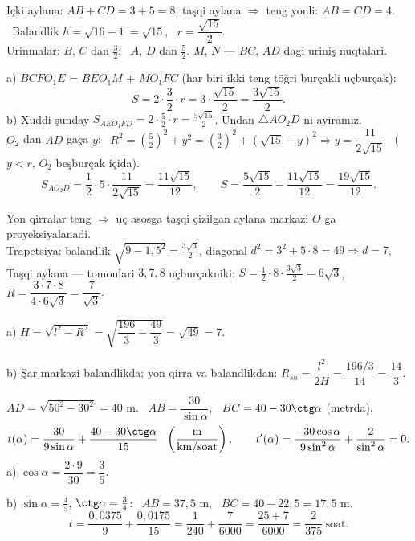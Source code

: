 \newpage
{}
Içki aylana: $AB+CD=3+5=8$; taşqi aylana $\Rightarrow$ teng yonli: $AB=CD=4$. \ Balandlik $h=\sqrt{16-1}=\sqrt{15}$, \ $r=\dfrac{\sqrt{15}}2$.\\
Urinmalar: $B$, $C$ dan $\frac32$; \ $A$, $D$ dan $\frac52$. $M$, $N$ — $BC$, $AD$ dagi uriniş nuqtalari.

a) $BCFO_1E$ = $BEO_1M$ + $MO_1FC$ (har biri ikki teng töğri burçakli uçburçak):
\[S=2\cdot\frac32\cdot r=3\cdot\frac{\sqrt{15}}2=\frac{3\sqrt{15}}2.\]
b) Xuddi şunday $S_{AEO_1FD}=2\cdot\frac52\cdot r=\frac{5\sqrt{15}}2$. Undan $\triangle AO_2D$ ni ayiramiz.\\
$O_2$ dan $AD$ gaça $y$: \ $R^2=\left(\frac52\right)^2+y^2=\left(\frac32\right)^2+(\sqrt{15}-y)^2\Rightarrow y=\dfrac{11}{2\sqrt{15}}$ \ ($y<r$, $O_2$ beşburçak içida).
\[S_{AO_2D}=\frac12\cdot5\cdot\frac{11}{2\sqrt{15}}=\frac{11\sqrt{15}}{12},\qquad S=\frac{5\sqrt{15}}2-\frac{11\sqrt{15}}{12}=\frac{19\sqrt{15}}{12}.\]

\newpage
{}
Yon qirralar teng $\Rightarrow$ uç asosga taşqi çizilgan aylana markazi $O$ ga proyeksiyalanadi.\\
Trapetsiya: balandlik $\sqrt{9-1{,}5^2}=\frac{3\sqrt3}2$, diagonal $d^2=3^2+5\cdot8=49\Rightarrow d=7$.\\
Taşqi aylana — tomonlari $3,7,8$ uçburçakniki: $S=\frac12\cdot8\cdot\frac{3\sqrt3}2=6\sqrt3$, \ $R=\dfrac{3\cdot7\cdot8}{4\cdot6\sqrt3}=\dfrac7{\sqrt3}$.

a) $H=\sqrt{l^2-R^2}=\sqrt{\dfrac{196}3-\dfrac{49}3}=\sqrt{49}=7$.

b) Şar markazi balandlikda; yon qirra va balandlikdan: $R_{sh}=\dfrac{l^2}{2H}=\dfrac{196/3}{14}=\dfrac{14}3$.

\newpage
{}
$AD=\sqrt{50^2-30^2}=40$ m. \ $AB=\dfrac{30}{\sin\alpha}$, \ $BC=40-30\ctg\alpha$ (metrda).
\[t(\alpha)=\frac{30}{9\sin\alpha}+\frac{40-30\ctg\alpha}{15}\ \ \left(\frac{\text{m}}{\text{km/soat}}\right),\qquad t'(\alpha)=\frac{-30\cos\alpha}{9\sin^2\alpha}+\frac{2}{\sin^2\alpha}=0.\]
a) $\cos\alpha=\dfrac{2\cdot9}{30}=\dfrac35$.

b) $\sin\alpha=\frac45$, $\ctg\alpha=\frac34$: \ $AB=37{,}5$ m, \ $BC=40-22{,}5=17{,}5$ m.
\[t=\frac{0{,}0375}9+\frac{0{,}0175}{15}=\frac1{240}+\frac7{6000}=\frac{25+7}{6000}=\frac{2}{375}\ \text{soat}.\]

\ShowJavoblar

